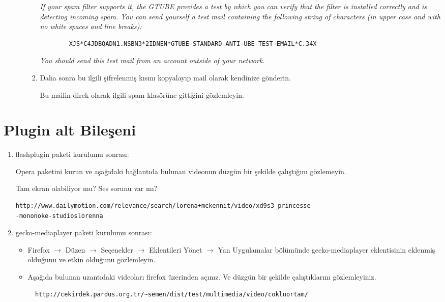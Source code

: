 \documentclass[a4paper,10pt]{article}
\begin{document}
\begin{enumerate}
\begin{enumerate}
\begin{enumerate}
		\emph{If your spam filter supports it, the GTUBE provides a test by which you
	    	can verify that the filter is installed correctly and is detecting incoming
    		spam. You can send yourself a test mail containing the following string of
    		characters (in upper case and with no white spaces and line breaks):}
		\begin{verbatim}
 		XJS*C4JDBQADN1.NSBN3*2IDNEN*GTUBE-STANDARD-ANTI-UBE-TEST-EMAIL*C.34X
		\end{verbatim}
    		\emph{You should send this test mail from an account outside of your network.}

		\item Daha sonra bu ilgili şifrelenmiş kısmı kopyalayıp mail olarak kendinize gönderin.
		
		Bu mailin direk olarak ilgili spam klasörüne gittiğini gözlemleyin.
	\end{enumerate} 
\end{enumerate} 
\end{enumerate}
\section{Plugin alt Bileşeni}
\begin{enumerate}
\item flashplugin paketi kurulumu sonrası:

Opera paketini kurun ve aşağıdaki bağlantıda bulunan videonun düzgün bir şekilde çalıştığını gözlemeyin.

Tam ekran olabiliyor mu? Ses sorunu var mı?
\begin{verbatim}
http://www.dailymotion.com/relevance/search/lorena+mckennit/video/xd9s3_princesse
-mononoke-studioslorenna 
\end{verbatim}

\item gecko-mediaplayer paketi kurulumu sonrası:
\begin{itemize}
  \item Firefox $\rightarrow$ Düzen $\rightarrow$ Seçenekler $\rightarrow$ Eklentileri Yönet $\rightarrow$ Yan Uygulamalar bölümünde gecko-mediaplayer eklentisinin eklenmiş olduğunu ve etkin olduğunu gözlemleyin.
  \item Aşağıda bulunan uzantıdaki videoları firefox üzerinden açınız. Ve düzgün bir şekilde çalıştıklarını gözlemleyiniz.
  \begin{verbatim}
  http://cekirdek.pardus.org.tr/~semen/dist/test/multimedia/video/cokluortam/  
  \end{verbatim}
\end{itemize}
\end{enumerate}
\end{document}
